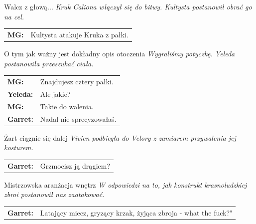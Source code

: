 \documentclass[10pt,twoside,twocolumn]{book}
\begin{document}
\begin{rpg-quotebox}{Walcz z głową...}
   \textit{Kruk Caliona włączył się do bitwy. Kultysta postanowił obrać go na cel.}\\
   
   \begin{tabularx}{\columnwidth}{lX}
      \textbf{MG:} & Kultysta atakuje Kruka z pałki.\\
   \end{tabularx}
\end{rpg-quotebox}


\begin{rpg-quotebox}{O tym jak ważny jest dokładny opis otoczenia}
   \textit{Wygraliśmy potyczkę. Yeleda postanowiła przeszukać ciała.}\\
   
   \begin{tabularx}{\columnwidth}{lX}
      \textbf{MG:} & Znajdujesz cztery pałki.\\
      \textbf{Yeleda:} & Ale jakie?\\
      \textbf{MG:} & Takie do walenia.\\
      \textbf{Garret:} & Nadal nie sprecyzowałaś.\\
   \end{tabularx}
\end{rpg-quotebox}


\begin{rpg-quotebox}{Żart ciągnie się dalej}
   \textit{Vivien podbiegła do Velory z zamiarem przywalenia jej kosturem. }\\
   
   \begin{tabularx}{\columnwidth}{lX}
      \textbf{Garret:} & Grzmocisz ją drągiem?\\
   \end{tabularx}
\end{rpg-quotebox}


\begin{rpg-quotebox}{Mistrzowska aranżacja wnętrz}
   \textit{W odpowiedzi na to, jak konstrukt krasnoludzkiej zbroi postanowił nas zaatakować.}\\
   
   \begin{tabularx}{\columnwidth}{lX}
      \textbf{Garret:} & Latający miecz, gryzący krzak, żyjąca zbroja - what the fuck?"\\
   \end{tabularx}
\end{rpg-quotebox}
\end{document}
